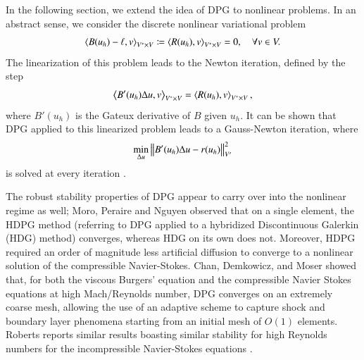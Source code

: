 \documentclass[preprint,12pt]{elsarticle}
\begin{document}
In the following section, we extend the idea of DPG to nonlinear problems.  In an abstract sense, we consider the discrete nonlinear variational problem
\[
\left\langle B(u_h)-\ell,v \right\rangle_{V^*\times V} \coloneqq \left\langle R(u_h),v \right\rangle_{V^*\times V} = 0, \quad \forall v \in V.
\]
The linearization of this problem leads to the Newton iteration, defined by the step
\[
\left\langle B'(u_h)\Delta u,v \right\rangle_{V^*\times V} = \left\langle R(u_h),v \right\rangle_{V^*\times V},
\]
where $B'(u_h)$ is the Gateux derivative of $B$ given $u_h$.  It can be shown that DPG applied to this linearized problem leads to a Gauss-Newton iteration, where 
\[
\min_{\Delta u} \left\| B'(u_h)\Delta u - r(u_h) \right\|_{V'}^2
\]
is solved at every iteration \cite{Chan2013dpg}.  

The robust stability properties of DPG appear to carry over into the nonlinear regime as well; Moro, Peraire and Nguyen observed \cite{MoroNguyenPeraire11, MoroMastersThesis} that on a single element, the HDPG method (referring to DPG applied to a hybridized Discontinuous Galerkin (HDG) method) converges, whereas HDG on its own does not.  Moreover, HDPG required an order of magnitude less artificial diffusion to converge to a nonlinear solution of the compressible Navier-Stokes.  Chan, Demkowicz, and Moser showed that, for both the viscous Burgers' equation and the compressible Navier Stokes equations at high Mach/Reynolds number, DPG converges on an extremely coarse mesh, allowing the use of an adaptive scheme to capture shock and boundary layer phenomena starting from an initial mesh of $O(1)$ elements.  Roberts reports similar results boasting similar stability for high Reynolds numbers for the incompressible Navier-Stokes equations \cite{NateDissertation}.  
\end{document}

